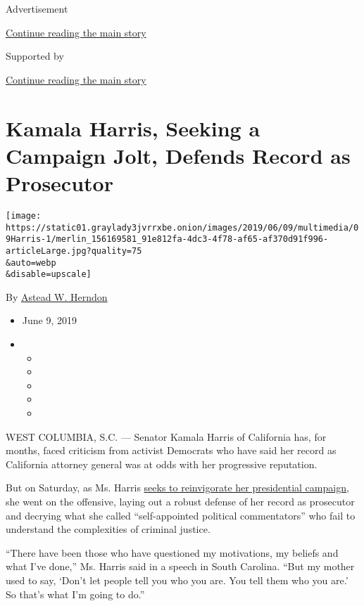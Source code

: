 Advertisement

\protect\hyperlink{after-top}{Continue reading the main story}

Supported by

\protect\hyperlink{after-sponsor}{Continue reading the main story}

\hypertarget{kamala-harris-seeking-a-campaign-jolt-defends-record-as-prosecutor}{%
\section{Kamala Harris, Seeking a Campaign Jolt, Defends Record as
Prosecutor}\label{kamala-harris-seeking-a-campaign-jolt-defends-record-as-prosecutor}}

\texttt{[image: https://static01.graylady3jvrrxbe.onion/images/2019/06/09/multimedia/09Harris-1/merlin\_156169581\_91e812fa-4dc3-4f78-af65-af370d91f996-articleLarge.jpg?quality=75\\\&auto=webp\\\&disable=upscale]}

By \href{https://www.nytimes3xbfgragh.onion/by/astead-w-herndon}{Astead
W. Herndon}

\begin{itemize}
\item
  June 9, 2019
\item
  \begin{itemize}
  \item
  \item
  \item
  \item
  \item
  \end{itemize}
\end{itemize}

WEST COLUMBIA, S.C. --- Senator Kamala Harris of California has, for
months, faced criticism from activist Democrats who have said her record
as California attorney general was at odds with her progressive
reputation.

But on Saturday, as Ms. Harris
\href{https://www.nytimes3xbfgragh.onion/2019/05/08/us/politics/kamala-harris-2020-trump.html}{seeks
to reinvigorate her presidential campaign}, she went on the offensive,
laying out a robust defense of her record as prosecutor and decrying
what she called ``self-appointed political commentators'' who fail to
understand the complexities of criminal justice.

``There have been those who have questioned my motivations, my beliefs
and what I've done,'' Ms. Harris said in a speech in South Carolina.
``But my mother used to say, `Don't let people tell you who you are. You
tell them who you are.' So that's what I'm going to do.''

